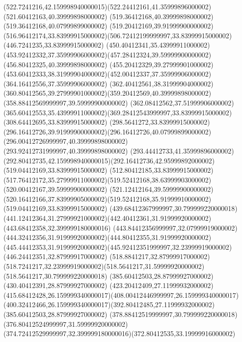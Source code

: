 {{	\curveto(522.7241216,42.159998940000015)(522.24412161,41.35999896000002)(521.60412163,40.39999898000002)
	\lineto(519.36412168,40.39999898000002)
	\lineto(519.36412168,40.07999899000002)
	\curveto(519.20412169,39.91999900000002)(516.96412174,33.83999915000002)(506.72412199999997,33.83999915000002)
	\lineto(446.7241235,33.83999915000002)
	\curveto(450.40412341,35.43999911000002)(453.92412332,37.35999906000002)(457.28412324,39.59999900000002)
	\lineto(456.80412325,40.39999898000002)
	\curveto(455.20412329,39.27999901000002)(453.60412333,38.31999904000002)(452.00412337,37.35999906000002)
	\lineto(364.16412556,37.35999906000002)
	\curveto(362.40412561,38.31999904000002)(360.80412565,39.27999901000002)(359.20412569,40.39999898000002)
	\lineto(358.88412569999997,39.59999900000002)
	\curveto(362.08412562,37.51999906000002)(365.60412553,35.43999911000002)(369.28412543999997,33.83999915000002)
	\lineto(308.64412695,33.83999915000002)
	\curveto(298.5641272,33.83999915000002)(296.16412726,39.91999900000002)(296.16412726,40.07999899000002)
	\lineto(296.00412726999997,40.39999898000002)
	\lineto(293.92412731999997,40.39999898000002)
	\curveto(293.44412733,41.35999896000002)(292.80412735,42.159998940000015)(292.16412736,42.95999892000002)
	\closepath
	\moveto(519.04412169,33.83999915000002)
	\lineto(512.80412185,33.83999915000002)
	\curveto(517.76412172,35.27999911000002)(519.52412168,38.63999903000002)(520.00412167,39.59999900000002)
	\lineto(521.12412164,39.59999900000002)
	\curveto(520.16412166,37.83999905000002)(519.52412168,35.91999910000002)(519.04412169,33.83999915000002)
	\closepath
	\moveto(439.68412367999997,30.799999220000018)
	\curveto(441.12412364,31.27999921000002)(442.40412361,31.91999920000002)(443.68412358,32.399999180000016)
	\curveto(443.84412356999997,32.07999919000002)(444.32412356,31.91999920000002)(444.80412355,31.91999920000002)
	\curveto(445.44412353,31.91999920000002)(445.92412351999997,32.23999919000002)(446.24412351,32.87999917000002)
	\lineto(518.8841217,32.87999917000002)
	\curveto(518.7241217,32.23999919000002)(518.5641217,31.59999920000002)(518.5641217,30.799999220000018)
	\closepath
	\moveto(385.60412503,28.87999927000002)
	\lineto(430.40412391,28.87999927000002)
	\curveto(423.20412409,27.11999932000002)(415.68412428,26.159999340000017)(408.00412446999997,26.159999340000017)
	\curveto(400.32412466,26.159999340000017)(392.80412485,27.11999932000002)(385.60412503,28.87999927000002)
	\closepath
	\moveto(378.88412519999997,30.799999220000018)
	\curveto(376.80412524999997,31.59999920000002)(374.72412529999997,32.399999180000016)(372.80412535,33.19999916000002)
}}
